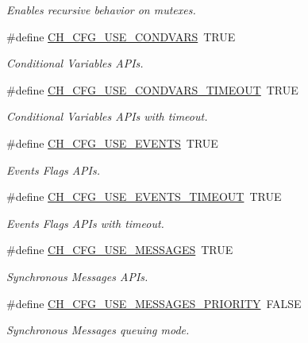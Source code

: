 \begin{DoxyCompactItemize}
\begin{DoxyCompactList}\small\item\em Enables recursive behavior on mutexes. \end{DoxyCompactList}\item 
\#define \hyperlink{group__config_ga73bc5a9da32221b5dd7759eed02a11fc}{C\+H\+\_\+\+C\+F\+G\+\_\+\+U\+S\+E\+\_\+\+C\+O\+N\+D\+V\+A\+R\+S}~T\+R\+U\+E
\begin{DoxyCompactList}\small\item\em Conditional Variables A\+P\+Is. \end{DoxyCompactList}\item 
\#define \hyperlink{group__config_gae286dae62e72f6bd17ecfbd69194b1bb}{C\+H\+\_\+\+C\+F\+G\+\_\+\+U\+S\+E\+\_\+\+C\+O\+N\+D\+V\+A\+R\+S\+\_\+\+T\+I\+M\+E\+O\+U\+T}~T\+R\+U\+E
\begin{DoxyCompactList}\small\item\em Conditional Variables A\+P\+Is with timeout. \end{DoxyCompactList}\item 
\#define \hyperlink{group__config_ga1469eb9d4445e870ed1a45a841c10fb3}{C\+H\+\_\+\+C\+F\+G\+\_\+\+U\+S\+E\+\_\+\+E\+V\+E\+N\+T\+S}~T\+R\+U\+E
\begin{DoxyCompactList}\small\item\em Events Flags A\+P\+Is. \end{DoxyCompactList}\item 
\#define \hyperlink{group__config_gad39f51eec096df2b73444e8fad5cfd11}{C\+H\+\_\+\+C\+F\+G\+\_\+\+U\+S\+E\+\_\+\+E\+V\+E\+N\+T\+S\+\_\+\+T\+I\+M\+E\+O\+U\+T}~T\+R\+U\+E
\begin{DoxyCompactList}\small\item\em Events Flags A\+P\+Is with timeout. \end{DoxyCompactList}\item 
\#define \hyperlink{group__config_ga10585bbb78d4b11d82814f38181e5a3a}{C\+H\+\_\+\+C\+F\+G\+\_\+\+U\+S\+E\+\_\+\+M\+E\+S\+S\+A\+G\+E\+S}~T\+R\+U\+E
\begin{DoxyCompactList}\small\item\em Synchronous Messages A\+P\+Is. \end{DoxyCompactList}\item 
\#define \hyperlink{group__config_gaa65eccee8e56f16bccf3709c23f7ac57}{C\+H\+\_\+\+C\+F\+G\+\_\+\+U\+S\+E\+\_\+\+M\+E\+S\+S\+A\+G\+E\+S\+\_\+\+P\+R\+I\+O\+R\+I\+T\+Y}~F\+A\+L\+S\+E
\begin{DoxyCompactList}\small\item\em Synchronous Messages queuing mode. \end{DoxyCompactList}\item 

\end{DoxyCompactItemize}

